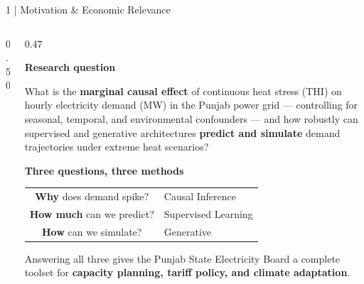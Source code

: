 \documentclass[aspectratio=169, 10pt]{beamer}
\begin{document}
\begin{frame}{1 \;|\; Motivation \& Economic Relevance}
\begin{columns}[T]
\begin{column}{0.50\textwidth}
\end{column}
\begin{column}{0.47\textwidth}

\textbf{Research question}

\begin{block}{}
\small
What is the \textbf{marginal causal effect} of continuous heat stress (THI) on
hourly electricity demand (MW) in the Punjab power grid — controlling for
seasonal, temporal, and environmental confounders — and how robustly can
supervised and generative architectures \textbf{predict and simulate} demand
trajectories under extreme heat scenarios?
\end{block}

\vspace{0.6em}
\textbf{Three questions, three methods}

\begin{tabular}{@{}cl@{}}
\toprule
\textbf{Why} does demand spike?   & \textcolor{dblue}{Causal Inference} \\
 \textbf{How much} can we predict?   & \textcolor{dgreen}{Supervised Learning} \\
\textbf{How} can we simulate? & \textcolor{dred}{Generative } \\
\bottomrule
\end{tabular}

\vspace{0.5em}
\small
Answering all three gives the Punjab State Electricity Board a complete
toolset for \textbf{capacity planning, tariff policy, and climate adaptation}.

\end{column}
\end{columns}

\end{frame}
\end{document}
